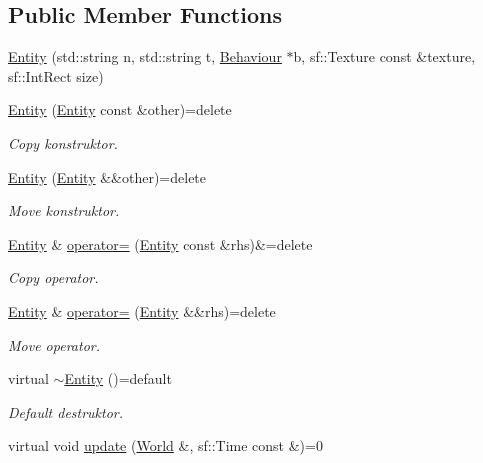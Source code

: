 \subsection*{Public Member Functions}
\begin{DoxyCompactItemize}
\item 
\hyperlink{classEntity_a832613c9d80ae6ee8b05d659e0842fbb}{Entity} (std\+::string n, std\+::string t, \hyperlink{classBehaviour}{Behaviour} $\ast$b, sf\+::\+Texture const \&texture, sf\+::\+Int\+Rect size)
\item 
\hyperlink{classEntity_a6d2e6788f8c2be303ebc2d67764f4127}{Entity} (\hyperlink{classEntity}{Entity} const \&other)=delete
\begin{DoxyCompactList}\small\item\em Copy konstruktor. \end{DoxyCompactList}\item 
\hyperlink{classEntity_a30c067e1de9094763c219fcc14c8419a}{Entity} (\hyperlink{classEntity}{Entity} \&\&other)=delete
\begin{DoxyCompactList}\small\item\em Move konstruktor. \end{DoxyCompactList}\item 
\hyperlink{classEntity}{Entity} \& \hyperlink{classEntity_a80dd8e5116a29007aef1039556d27d56}{operator=} (\hyperlink{classEntity}{Entity} const \&rhs)\&=delete
\begin{DoxyCompactList}\small\item\em Copy operator. \end{DoxyCompactList}\item 
\hyperlink{classEntity}{Entity} \& \hyperlink{classEntity_a0d03f941fda7705c726bf819d71faf6c}{operator=} (\hyperlink{classEntity}{Entity} \&\&rhs)=delete
\begin{DoxyCompactList}\small\item\em Move operator. \end{DoxyCompactList}\item 
virtual \hyperlink{classEntity_ac479d009ddde62dfb378ca0a70d81307}{$\sim$\+Entity} ()=default
\begin{DoxyCompactList}\small\item\em Default destruktor. \end{DoxyCompactList}\item 
virtual void \hyperlink{classEntity_a180102ac6695559b1f8fcf0aee747802}{update} (\hyperlink{classWorld}{World} \&, sf\+::\+Time const \&)=0
\item 

\end{DoxyCompactItemize}
